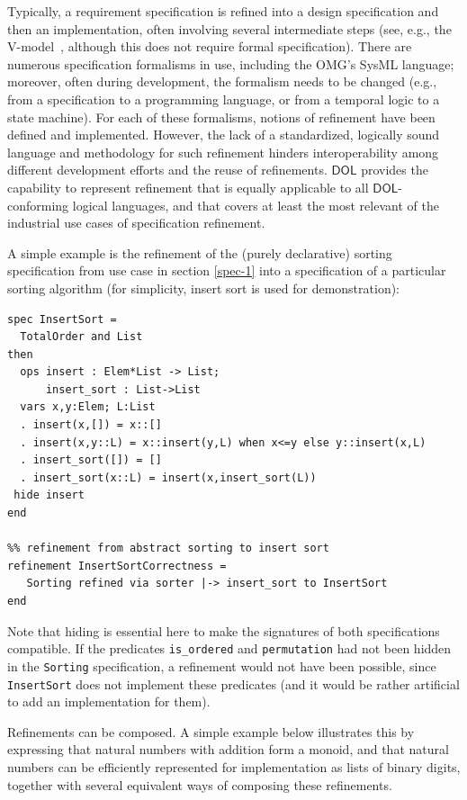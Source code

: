 \documentclass[10pt, a4paper]{isov2}
\newcommand*{\DOL}{\ensuremath{\mathsf{DOL}}\xspace}
\begin{document}
Typically, a requirement specification is refined into a
design specification and then an implementation, often involving
several intermediate steps (see, e.g., the V-model~\cite{V-model}, although
this does not require formal specification).  There are numerous
specification formalisms in use, including the OMG's SysML language;
moreover, often during development, the formalism needs to be changed
(e.g., from a specification to a programming language, or from a
temporal logic to a state machine). For each of these formalisms,
notions of refinement have been defined and implemented. However, the
lack of a standardized, logically sound language and methodology for
such refinement hinders interoperability among different development
efforts and the reuse of refinements.  \DOL provides the capability to
represent refinement that is equally applicable to all \DOL-conforming
logical languages, and that covers at least the most relevant of the
industrial use cases of specification refinement.

A simple example is the refinement of the (purely declarative) sorting
specification from use case in section \ref{spec-1} into a specification of a particular sorting
algorithm (for simplicity, insert sort is used for demonstration):

\begin{lstlisting}[basicstyle=\ttfamily\footnotesize,language=dolText,alsolanguage=CASL,escapechar=@,mathescape]
spec InsertSort =
  TotalOrder and List
then
  ops insert : Elem*List -> List;
      insert_sort : List->List
  vars x,y:Elem; L:List
  . insert(x,[]) = x::[]
  . insert(x,y::L) = x::insert(y,L) when x<=y else y::insert(x,L)
  . insert_sort([]) = []
  . insert_sort(x::L) = insert(x,insert_sort(L))
 hide insert
end

%% refinement from abstract sorting to insert sort
refinement InsertSortCorrectness =
   Sorting refined via sorter |-> insert_sort to InsertSort
end
\end{lstlisting}
Note that hiding is essential here to make the signatures of
both specifications compatible. If  the
predicates \texttt{is\_ordered} and \texttt{permutation}
had not been hidden in the \texttt{Sorting} specification, a refinement would
not have been possible, since \texttt{InsertSort} does not
implement these predicates (and it would be rather artificial
to add an implementation for them).

\medskip

Refinements can be composed. A simple example below illustrates this
by expressing that natural numbers with addition form a monoid, and
that natural numbers can be efficiently represented for implementation
as lists of binary digits, together with several equivalent ways of
composing these refinements.
\end{document}
